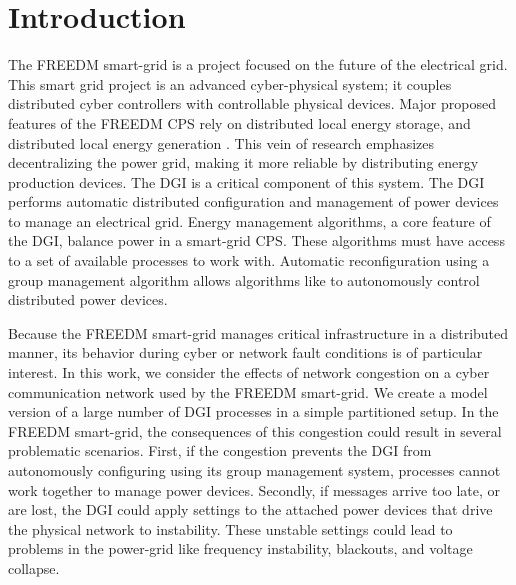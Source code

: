 
\section{Introduction}

The \ac{FREEDM}\cite{FREEDM} smart-grid is a project focused on the future of the electrical grid.
This smart grid project is an advanced cyber-physical system; it couples distributed cyber controllers with controllable physical devices.
Major proposed features of the \ac{FREEDM} \ac{CPS} rely on distributed local energy storage, and distributed local energy generation \cite{FREEDMMIGRATION}.
This vein of research emphasizes decentralizing the power grid, making it more reliable by distributing energy production devices.
The \ac{DGI} is a critical component of this system.
The \ac{DGI} performs automatic distributed configuration and management of power devices to manage an electrical grid.
Energy management algorithms, a core feature of the \ac{DGI}\cite{LOADBALANCING}, balance power in a smart-grid \ac{CPS}.
These algorithms must have access to a set of available processes to work with.
Automatic reconfiguration using a group management algorithm allows algorithms like \cite{LOADBALANCING}\cite{ICC1}\cite{MOYEEN} to autonomously control distributed power devices.

Because the \ac{FREEDM} smart-grid manages critical infrastructure in a distributed manner, its behavior during cyber or network fault conditions is of particular interest.
In this work, we consider the effects of network congestion on a cyber communication network used by the \ac{FREEDM} smart-grid.
We create a model version of a large number of \ac{DGI} processes in a simple partitioned setup.
In  the \ac{FREEDM} smart-grid, the consequences of this congestion could result in several problematic scenarios.
First, if the congestion prevents the \ac{DGI} from autonomously configuring using its group management system, processes cannot work together to manage power devices.
Secondly, if messages arrive too late, or are lost, the \ac{DGI} could apply settings to the attached power devices that drive the physical network to instability.
These unstable settings could lead to problems in the power-grid like frequency instability, blackouts, and voltage collapse.

